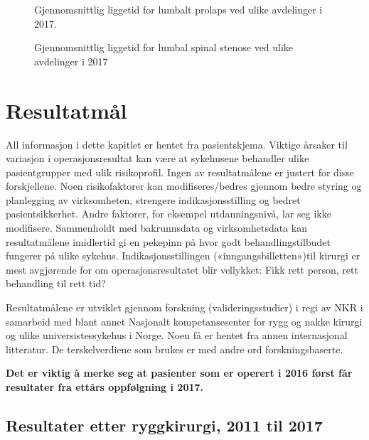 \begin{figure}[h] 
\caption{Gjennomsnittlig liggetid for lumbalt prolaps ved ulike avdelinger i 2017. } 
\label{fig:LiggetidAvdPro}
\end{figure}

\begin{figure}[h] 
\caption{Gjennomsnittlig liggetid for lumbal spinal stenose ved ulike avdelinger i 2017 } 
\label{fig:LiggetidAvdSS}
\end{figure}


      
      
      
      
      \clearpage

\section{Resultatmål}
All informasjon i dette kapitlet er hentet fra pasientskjema.  Viktige årsaker til variasjon i operasjonsresultat kan være at sykehusene behandler
ulike pasientgrupper med ulik risikoprofil. Ingen av resultatmålene er justert
for disse forskjellene. Noen risikofaktorer kan modifiseres/bedres gjennom bedre styring og planlegging av
virksomheten, strengere indikasjonsstilling og bedret pasientsikkerhet. Andre faktorer, for eksempel utdanningsnivå, lar seg ikke modifisere.
Sammenholdt med bakrunnsdata og virksomhetsdata kan resultatmålene imidlertid gi en pekepinn på hvor godt behandlingstilbudet fungerer på ulike sykehus. Indikasjonsstillingen («inngangsbilletten»)til kirurgi er mest avgjørende for om operasjonsresultatet blir vellykket: Fikk rett person, rett
behandling til rett tid?

Resultatmålene er utviklet gjennom forskning (valideringsstudier) i regi av NKR i samarbeid
med blant annet Nasjonalt kompetansesenter for rygg og nakke kirurgi og ulike universistessykehus i Norge. Noen få er hentet fra annen
internasjonal litteratur. De terskelverdiene som brukes er med andre ord forskningsbaserte.
 
\textbf{Det er viktig å merke seg at pasienter som er operert i 2016 først får resultater fra ettårs oppfølgning i 2017.} 


      
      


      
      \subsection{ Resultater etter ryggkirurgi, 2011 til 2017}

